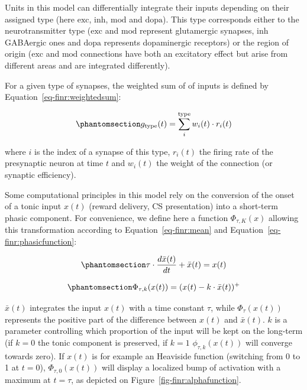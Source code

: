 \documentclass[
  11pt,
  a4paper,
]{scrbook}
\begin{document}
Units in this model can differentially integrate their inputs depending
on their assigned type (here \(\text{exc}\), \(\text{inh}\),
\(\text{mod}\) and \(\text{dopa}\)). This type corresponds either to the
neurotransmitter type (\(\text{exc}\) and \(\text{mod}\) represent
glutamergic synapses, \(\text{inh}\) GABAergic ones and \(\text{dopa}\)
represents dopaminergic receptors) or the region of origin
(\(\text{exc}\) and \(\text{mod}\) connections have both an excitatory
effect but arise from different areas and are integrated differently).

For a given type of synapses, the weighted sum of of inputs is defined
by Equation~\ref{eq-finr:weightedsum}:

\begin{equation}\phantomsection\label{eq-finr:weightedsum}{
    g_{\text{type}}(t) = \sum_i^{\text{type}} w_i(t) \cdot r_i(t)
}\end{equation}

where \(i\) is the index of a synapse of this type, \(r_i(t)\) the
firing rate of the presynaptic neuron at time \(t\) and \(w_i(t)\) the
weight of the connection (or synaptic efficiency).

Some computational principles in this model rely on the conversion of
the onset of a tonic input \(x(t)\) (reward delivery, CS presentation)
into a short-term phasic component. For convenience, we define here a
function \(\Phi_{\tau, K}(x)\) allowing this transformation according to
Equation~\ref{eq-finr:mean} and Equation~\ref{eq-finr:phasicfunction}:

\begin{equation}\phantomsection\label{eq-finr:mean}{
    \tau \cdot \frac{d\bar{x}(t)}{dt} + \bar{x}(t) = x(t)
}\end{equation}

\begin{equation}\phantomsection\label{eq-finr:phasicfunction}{
    \Phi_{\tau, k}(x(t)) = (x(t) - k \cdot \bar{x}(t) )^+
}\end{equation}

\(\bar{x}(t)\) integrates the input \(x(t)\) with a time constant
\(\tau\), while \(\Phi_\tau(x(t))\) represents the positive part of the
difference between \(x(t)\) and \(\bar{x}(t)\). \(k\) is a parameter
controlling which proportion of the input will be kept on the long-term
(if \(k=0\) the tonic component is preserved, if \(k=1\)
\(\phi_{\tau, k}(x(t))\) will converge towards zero). If \(x(t)\) is for
example an Heaviside function (switching from 0 to 1 at \(t=0\)),
\(\Phi_{\tau, 0}(x(t))\) will display a localized bump of activation
with a maximum at \(t=\tau\), as depicted on
Figure~\ref{fig-finr:alphafunction}.
\end{document}
